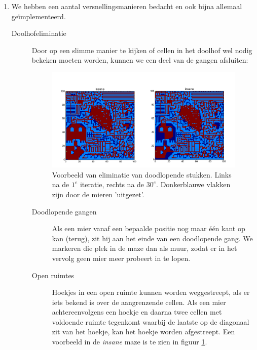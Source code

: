 \documentclass[a4paper,10pt,fleqn]{article}
\begin{document}
\begin{enumerate}[1.]
    \item
        We hebben een aantal versnellingsmanieren bedacht en ook bijna allemaal geïmplementeerd.
        \begin{description}
            \item[Doolhofeliminatie]
                Door op een slimme manier te kijken of cellen in het doolhof wel nodig bekeken moeten worden, kunnen we een deel van de gangen afsluiten:
                \begin{figure}[!ht]
                    \centering
                    \includegraphics[width=\textwidth]{images/maze-elimination.png}
                    \caption{Voorbeeld van eliminatie van doodlopende stukken. Links na de $1^e$ iteratie, rechts na de $30^e$. Donkerblauwe vlakken zijn door de mieren 'uitgezet'.}
                    \label{elimination}
                \end{figure}
              \begin{description}
                  \item[Doodlopende gangen] Als een mier vanaf een bepaalde positie nog maar één kant op kan (terug), zit hij aan het einde van een doodlopende gang. We markeren die plek in de maze dan als muur, zodat er in het vervolg geen mier meer probeert in te lopen.
                  \item[Open ruimtes] Hoekjes in een open ruimte kunnen worden weggestreept, als er iets bekend is over de aangrenzende cellen. Als een mier achtereenvolgens een hoekje en daarna twee cellen met voldoende ruimte tegenkomt waarbij de laatste op de diagonaal zit van het hoekje, kan het hoekje worden afgestreept. Een voorbeeld in de \textit{insane} maze is te zien in figuur \ref{elimination}.


\end{description}
\end{description}
\end{enumerate}
\end{document}

